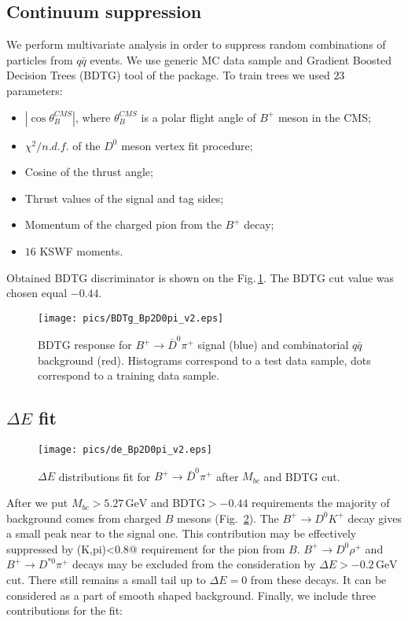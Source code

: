 \documentclass[preprint,aps,showpacs]{revtex4}
\newcommand{\bptodpi}{\ensuremath{B^{+}\to \bar D^0\pi^+}\xspace}
\begin{document}
\subsection{Continuum suppression}
 We perform multivariate analysis in order to suppress random combinations of particles from $q\bar q$ events. We use generic MC data sample and Gradient Boosted Decision Trees (BDTG) tool of the \verb@TMVA@ package. To train trees we used $23$ parameters:
 \begin{itemize}
  \item $\left|\cos{\theta^{CMS}_B}\right|$, where $\theta^{CMS}_B$ is a polar flight angle of $B^+$ meson in the CMS;
  \item $\chi^2/n.d.f.$ of the $D^0$ meson vertex fit procedure;
  \item Cosine of the thrust angle;
  \item Thrust values of the signal and tag sides;
  \item Momentum of the charged pion from the $B^+$ decay;
  \item $16$ KSWF moments.
 \end{itemize}

Obtained BDTG discriminator is shown on the Fig.\,\ref{fig:bdtg-bptodpi}. The BDTG cut value was chosen equal $-0.44$.
\begin{figure}[htb]
\texttt{[image: pics/BDTg\_Bp2D0pi\_v2.eps]}
\caption{BDTG response for \bptodpi signal (blue) and combinatorial $q\bar q$ background (red). Histograms correspond to a test data sample, dots correspond to a training data sample.}
\label{fig:bdtg-bptodpi}
\end{figure}

\subsection{$\Delta E$  fit}
\begin{figure}[htb]
\texttt{[image: pics/de\_Bp2D0pi\_v2.eps]}
\caption{$\Delta E$ distributions fit for \bptodpi after $M_{bc}$ and BDTG cut.}
\label{fig:raw-de-bptodpi}
\end{figure}
After we put $M_{bc}>5.27\, \text{GeV}$ and BDTG$>-0.44$ requirements the majority of background comes from charged $B$ mesons (Fig.~\ref{fig:raw-de-bptodpi}). The $B^+\to D^0K^+$ decay gives a small peak near to the signal one. This contribution may be effectively suppressed by \verb@atc(K,pi)<0.8@ requirement for the pion from $B$. $B^+\to D^0\rho^+$ and $B^+\to D^{*0}\pi^+$ decays may be excluded from the consideration by $\Delta E>-0.2\,\text{GeV}$ cut. There still remains a small tail up to $\Delta E = 0$ from these decays. It can be considered as a part of smooth shaped background.
Finally, we include three contributions for the fit:
\end{document}
